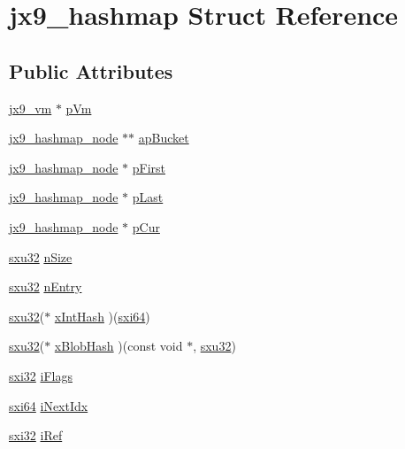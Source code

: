 \hypertarget{structjx9__hashmap}{\section{jx9\-\_\-hashmap Struct Reference}
\label{da/d5e/structjx9__hashmap}
}
\subsection*{Public Attributes}
\begin{DoxyCompactItemize}
\item 
\hyperlink{structjx9__vm}{jx9\-\_\-vm} $\ast$ \hyperlink{structjx9__hashmap_a49bf64660f1d11508b45d2817b43f72b}{p\-Vm}
\item 
\hyperlink{structjx9__hashmap__node}{jx9\-\_\-hashmap\-\_\-node} $\ast$$\ast$ \hyperlink{structjx9__hashmap_a0841e7039abe953ac68f427e3af2a879}{ap\-Bucket}
\item 
\hyperlink{structjx9__hashmap__node}{jx9\-\_\-hashmap\-\_\-node} $\ast$ \hyperlink{structjx9__hashmap_a6eb1e6282a3194e4367b72dd94500c7d}{p\-First}
\item 
\hyperlink{structjx9__hashmap__node}{jx9\-\_\-hashmap\-\_\-node} $\ast$ \hyperlink{structjx9__hashmap_a3ef7dd7f12ead48b065650c139e31609}{p\-Last}
\item 
\hyperlink{structjx9__hashmap__node}{jx9\-\_\-hashmap\-\_\-node} $\ast$ \hyperlink{structjx9__hashmap_aec49cafee18835a1116198c3c2c97bb3}{p\-Cur}
\item 
\hyperlink{unqlite_8c_abc5a8a3f345c200c98c485551f49666e}{sxu32} \hyperlink{structjx9__hashmap_a4eaf761ed4a628b6fb12815efaf3083b}{n\-Size}
\item 
\hyperlink{unqlite_8c_abc5a8a3f345c200c98c485551f49666e}{sxu32} \hyperlink{structjx9__hashmap_a158005676f92744f199c5f0b2bbfb2d4}{n\-Entry}
\item 
\hyperlink{unqlite_8c_abc5a8a3f345c200c98c485551f49666e}{sxu32}($\ast$ \hyperlink{structjx9__hashmap_ae21a47f43f38dbc202f8ec521166d6ce}{x\-Int\-Hash} )(\hyperlink{unqlite_8c_a7913a13763a99412223d5dfa1829dd73}{sxi64})
\item 
\hyperlink{unqlite_8c_abc5a8a3f345c200c98c485551f49666e}{sxu32}($\ast$ \hyperlink{structjx9__hashmap_ab6399de90da8cf5da1b492ef5929fc6d}{x\-Blob\-Hash} )(const void $\ast$, \hyperlink{unqlite_8c_abc5a8a3f345c200c98c485551f49666e}{sxu32})
\item 
\hyperlink{unqlite_8c_a5a58035d4ae379178e2ca46cc3272fc5}{sxi32} \hyperlink{structjx9__hashmap_ab7527474f3ea969ed87e358440fe7893}{i\-Flags}
\item 
\hyperlink{unqlite_8c_a7913a13763a99412223d5dfa1829dd73}{sxi64} \hyperlink{structjx9__hashmap_ac5f553174cd5ca3932596b327eaad0b5}{i\-Next\-Idx}
\item 
\hyperlink{unqlite_8c_a5a58035d4ae379178e2ca46cc3272fc5}{sxi32} \hyperlink{structjx9__hashmap_a96fc8363536e741de813e1b425ceb853}{i\-Ref}
\end{DoxyCompactItemize}


